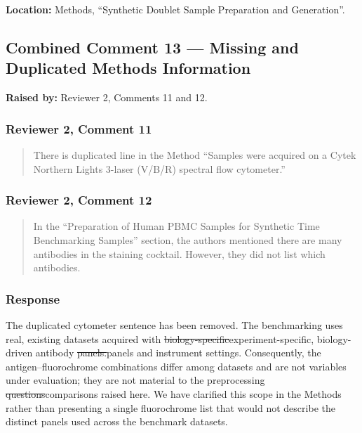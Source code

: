 \documentclass[
  11pt,
  a4paper,
]{article}
\begin{document}
\textbf{Location:} Methods, ``Synthetic Doublet Sample Preparation and
Generation''.

\subsection{Combined Comment 13 --- Missing and Duplicated Methods
Information}\label{combined-comment-13--missing-and-duplicated-methods-information}

\textbf{Raised by:} Reviewer 2, Comments 11 and 12.

\subsubsection{Reviewer 2, Comment 11}\label{reviewer-2-comment-11}

\begin{quote}
There is duplicated line in the Method ``Samples were acquired on a
Cytek Northern Lights 3-laser (V/B/R) spectral flow cytometer.''
\end{quote}

\subsubsection{Reviewer 2, Comment 12}\label{reviewer-2-comment-12}

\begin{quote}
In the ``Preparation of Human PBMC Samples for Synthetic Time
Benchmarking Samples'' section, the authors mentioned there are many
antibodies in the staining cocktail. However, they did not list which
antibodies.
\end{quote}

\subsubsection{Response}\label{response-12}

The duplicated cytometer sentence has been removed. The benchmarking
uses real, existing datasets acquired with
{\color{revisionred}\sout{biology-specific}}{\color{revisionblue}experiment-specific,
biology-driven} antibody
{\color{revisionred}\sout{panels.}}{\color{revisionblue}panels and
instrument settings.} Consequently, the antigen--fluorochrome
combinations differ among datasets and are not variables under
evaluation; they are not material to the preprocessing
{\color{revisionred}\sout{questions}}{\color{revisionblue}comparisons}
raised here. We have clarified this scope in the Methods rather than
presenting a single fluorochrome list that would not describe the
distinct panels used across the benchmark datasets.
\end{document}
